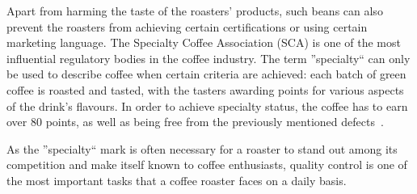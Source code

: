 Apart from harming the taste of the roasters' products, such beans can also prevent
the roasters from achieving certain certifications or using certain marketing language.
The Specialty Coffee Association (SCA) is one of the most influential regulatory
bodies in the coffee industry.
The term ''specialty`` can only be used to describe
coffee when certain criteria are achieved: each batch of green coffee is roasted
and tasted, with the tasters awarding points for various aspects of the drink's flavours.
In order to achieve specialty status, the coffee has to earn over 80 points, as
well as being free from the previously mentioned defects~\cite{scaCuppingProtocol}.

As the ''specialty`` mark is often necessary for a roaster to stand out among
its competition and make itself known to coffee enthusiasts, quality control is one
of the most important tasks that a coffee roaster faces on a daily basis.


